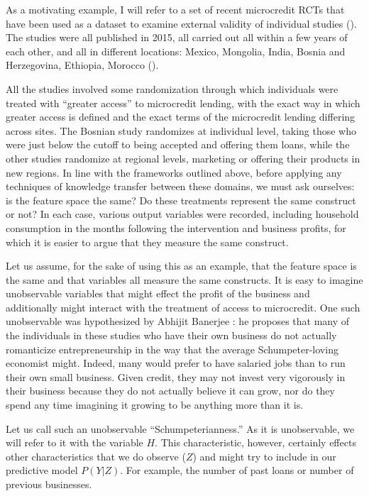 \documentclass[a4paper,12pt]{article}
\begin{document}
As a motivating example, I will refer to a set of recent microcredit RCTs that have been used as a dataset to examine external validity of individual studies (\cite{Pritchett2016, Meager2018}). The studies were all published in 2015, all carried out all within a few years of each other, and all in different locations: Mexico, Mongolia, India, Bosnia and Herzegovina, Ethiopia, Morocco (\cite{Attanasio2015, Angelucci2015, Augsburg2015, Banerjee2015, Crepon2015, Tarozzi2015}).

All the studies involved some randomization through which individuals were treated with ``greater access'' to microcredit lending, with the exact way in which greater access is defined and the exact terms of the microcredit lending differing across sites. The Bosnian study randomizes at individual level, taking those who were just below the cutoff to being accepted and offering them loans, while the other studies randomize at regional levels, marketing or offering their products in new regions. In line with the frameworks outlined above, before applying any techniques of knowledge transfer between these domains, we must ask ourselves: is the feature space the same? Do these treatments represent the same construct or not? In each case, various output variables were recorded, including household consumption in the months following the intervention and business profits, for which it is easier to argue that they measure the same construct.

Let us assume, for the sake of using this as an example, that the feature space is the same and that variables all measure the same constructs. It is easy to imagine unobservable variables that might effect the profit of the business and additionally might interact with the treatment of access to microcredit. One such unobservable was hypothesized by Abhijit Banerjee \parencite*{Banerjee2011}: he proposes that many of the individuals in these studies who have their own business do not actually romanticize entrepreneurship in the way that the average Schumpeter-loving economist might. Indeed, many would prefer to have salaried jobs than to run their own small business. Given credit, they may not invest very vigorously in their business because they do not actually believe it can grow, nor do they spend any time imagining it growing to be anything more than it is.

Let us call such an unobservable ``Schumpeterianness.'' As it is unobservable, we will refer to it with the variable $H$. This characteristic, however, certainly effects other characteristics that we do observe ($Z$) and might try to include in our predictive model $P(Y|Z)$. For example, the number of past loans or number of previous businesses.
\end{document}
